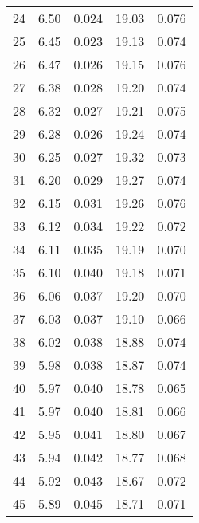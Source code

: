 \begin{table}
\begin{tabular}{c|ll|ll}
24 & 6.50 & 0.024 & 19.03 & 0.076 \\
25 & 6.45 & 0.023 & 19.13 & 0.074 \\
26 & 6.47 & 0.026 & 19.15 & 0.076 \\
27 & 6.38 & 0.028 & 19.20 & 0.074 \\
28 & 6.32 & 0.027 & 19.21 & 0.075 \\
29 & 6.28 & 0.026 & 19.24 & 0.074 \\
30 & 6.25 & 0.027 & 19.32 & 0.073 \\
31 & 6.20 & 0.029 & 19.27 & 0.074 \\
32 & 6.15 & 0.031 & 19.26 & 0.076 \\
33 & 6.12 & 0.034 & 19.22 & 0.072 \\
34 & 6.11 & 0.035 & 19.19 & 0.070 \\
35 & 6.10 & 0.040 & 19.18 & 0.071 \\
36 & 6.06 & 0.037 & 19.20 & 0.070 \\
37 & 6.03 & 0.037 & 19.10 & 0.066 \\
38 & 6.02 & 0.038 & 18.88 & 0.074 \\
39 & 5.98 & 0.038 & 18.87 & 0.074 \\
40 & 5.97 & 0.040 & 18.78 & 0.065 \\
41 & 5.97 & 0.040 & 18.81 & 0.066 \\
42 & 5.95 & 0.041 & 18.80 & 0.067 \\
43 & 5.94 & 0.042 & 18.77 & 0.068 \\
44 & 5.92 & 0.043 & 18.67 & 0.072 \\
45 & 5.89 & 0.045 & 18.71 & 0.071 \\
               \hline
        \end{tabular}
    \end{table}
    \clearpage

